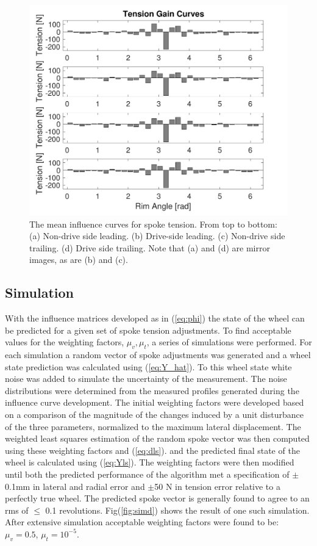 \documentclass[journal]{IEEEtran}
\begin{document}
\begin{figure}[!t]
\centering
\includegraphics[width=3.25 in]{./figs/gc_ten}
\caption{The mean influence curves for spoke tension. From top to bottom: (a) Non-drive side leading. (b) Drive-side leading. (c) Non-drive side trailing. (d) Drive side trailing.  Note that (a) and (d) are mirror images, as are (b) and (c).}
\label{fig:gc_ten}
\end{figure}

\subsection{Simulation}
With the influence matrices developed as in (\ref{eq:phi}) the state of the wheel can be predicted for a given set of spoke tension adjustments.  To find acceptable values for the weighting factors, $\mu_v,\mu_t$, a series of simulations were performed.  For each simulation a random vector of spoke adjustments was generated and a wheel state prediction was calculated using (\ref{eq:Y_hat}). To this wheel state white noise was added to simulate the uncertainty of the measurement.  The noise distributions were determined from the measured profiles generated during the influence curve development.  The initial weighting factors were developed based on a comparison of the magnitude of the changes induced by a unit disturbance of the three parameters, normalized to the maximum lateral displacement. The weighted least squares estimation of the random spoke vector was then computed using these weighting factors and (\ref{eq:dls}). and the predicted final state of the wheel is calculated using (\ref{eq:Yls}). The weighting factors were then modified until both the predicted performance of the algorithm met a specification of $\pm$ 0.1mm in lateral and radial error and $\pm$50 N in tension error relative to a perfectly true wheel. The predicted spoke vector is generally found to agree to an rms of $\leq$ 0.1 revolutions. Fig(\ref{fig:simd}) shows the result of one such simulation. After extensive simulation acceptable weighting factors were found to be: $\mu_v = 0.5$, $ \mu_t =10^{-5}$.
\end{document}
